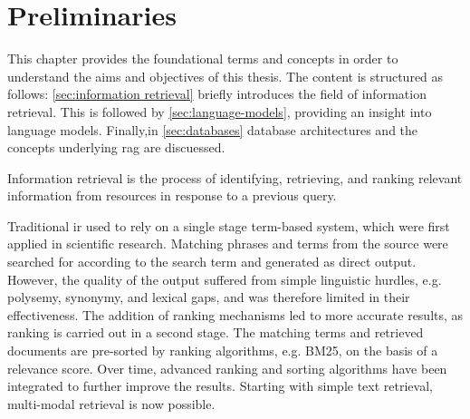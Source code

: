 \chapter{Preliminaries}\label{ch:preliminaries}
This chapter provides the foundational terms and concepts in order to understand the aims and objectives of this thesis.
%
The content is structured as follows: \cref{sec:information retrieval} briefly introduces the field of information retrieval. This is followed by \cref{sec:language-models}, providing an insight into language models. 
Finally,in \cref{sec:databases} database architectures and the concepts underlying \ac{rag} are discuessed. 
%
\begin{definition}\label{def:information retrieval}
Information retrieval is the process of identifying, retrieving, and ranking relevant information from resources in response to a previous query. 
\end{definition}
%
Traditional \ac{ir} used to rely on a single stage term-based system, which were first applied in scientific research. Matching phrases and terms from the source were searched for according to the search term and generated as direct output.
However, the quality of the output suffered from simple linguistic hurdles, e.g. polysemy, synonymy, and lexical gaps, and was therefore limited in their effectiveness. 
The addition of ranking mechanisms led to more accurate results, as ranking is carried out in a second stage. 
The matching terms and retrieved documents are pre-sorted by ranking algorithms, e.g. BM25, on the basis of a relevance score. 
Over time, advanced ranking and sorting algorithms have been integrated to further improve the results. \citep{hambardeIR2023}
Starting with simple text retrieval, multi-modal retrieval is now possible.
%
